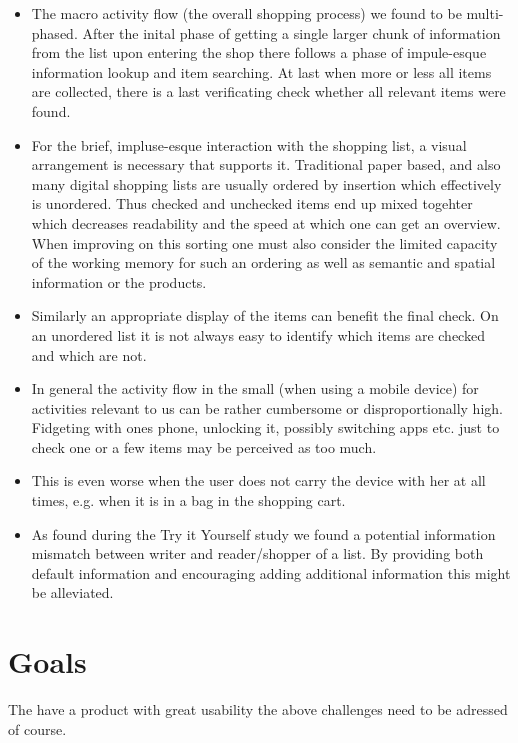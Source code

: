 \documentclass{scrartcl}
\begin{document}
\begin{itemize}
  \item The macro activity flow (the overall shopping process) we found to be multi-phased. 
    After the inital phase of getting a single larger chunk of information from the list upon entering the shop there follows a phase of impule-esque information lookup and item searching.
    At last when more or less all items are collected, there is a last verificating check whether all relevant items were found.
  \item For the brief, impluse-esque interaction with the shopping list, a visual arrangement is necessary that supports it. 
    Traditional paper based, and also many digital shopping lists are usually ordered by insertion which effectively is unordered. 
    Thus checked and unchecked items end up mixed togehter which decreases readability and the speed at which one can get an overview.
    When improving on this sorting one must also consider the limited capacity of the working memory for such an ordering as well as semantic and spatial information or the products.
  \item Similarly an appropriate display of the items can benefit the final check. 
    On an unordered list it is not always easy to identify which items are checked and which are not.

  \item In general the activity flow in the small (when using a mobile device) for activities relevant to us can be rather cumbersome or disproportionally high.
    Fidgeting with ones phone, unlocking it, possibly switching apps etc. just to check one or a few items may be perceived as too much.
  \item This is even worse when the user does not carry the device with her at all times, e.g. when it is in a bag in the shopping cart. 

  \item As found during the Try it Yourself study we found a potential information mismatch between writer and reader/shopper of a list. 
    By providing both default information and encouraging adding additional information this might be alleviated.
\end{itemize}


\section{Goals}
\label{sec:goal}
The have a product with great usability the above challenges need to be adressed of course.
\end{document}
